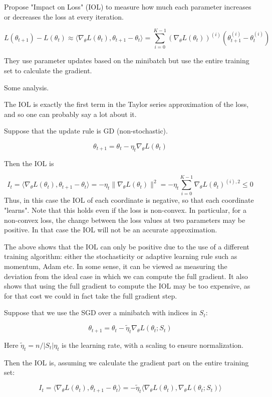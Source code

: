 \documentclass[english]{article}
\begin{document}
Propose "Impact on
Loss" (IOL) to measure how much each
parameter increases or decreases the loss at
every iteration.

$$L(\theta_{t+1} ) - L(\theta_{t} ) \approx 
\langle\nabla_\theta L(\theta_{t} ), \theta_{t+1} - \theta_{t} 
\rangle
=
\sum_{i=0}^{K-1}
(\nabla_\theta L(\theta_{t} ))^{(i)} (\theta
^{(i)}_{t+1}
- \theta^{(i)}_t)
$$

They use parameter updates based on the minibatch but use the entire training set to
calculate the gradient.


Some analysis.

The IOL is exactly the first term in the Taylor series approximation of the loss, and so one can probably say a lot about it. 

Suppose that the update rule is GD (non-stochastic). 

$$\theta_{t+1} = \theta_{t} - \eta_t \nabla_\theta L(\theta_{t})$$

Then the IOL is 

$$I_t = 
\langle\nabla_\theta L(\theta_{t} ), \theta_{t+1} - \theta_{t} 
\rangle
=
- \eta_t 
\|\nabla_\theta L(\theta_{t} )\|^2
=
- \eta_t\sum_{i=0}^{K-1}
\nabla_\theta L(\theta_{t} )^{(i),2}\le 0
$$
Thus, in this case the IOL of each coordinate is negative, so that each coordinate "learns". Note that this holds even if the loss is non-convex. In particular, for a non-convex loss, the change between the loss values at two parameters may be positive. In that case the IOL will not be an accurate approximation.

The above shows that the IOL can only be positive due to the use of a different training algorithm: either the stochasticity or adaptive learning rule such as momentum, Adam etc. In some sense, it can be viewed as measuring the deviation from the ideal case in which we can compute the full gradient. It also shows that using the full gradient to compute the IOL may be too expensive, as for that cost we could in fact take the full gradient step. 


Suppose that we use the SGD over a minibatch with indices in $S_t$: 

$$\theta_{t+1} = \theta_{t} - \tilde\eta_t \nabla_\theta L(\theta_{t};S_t)$$

Here $\tilde\eta_t = n/|S_t|\eta_t$ is the learning rate, with a scaling to ensure normalization. 

Then the IOL is, assuming we calculate the gradient part on the entire training set: 

$$I_t = 
\langle\nabla_\theta L(\theta_{t} ), \theta_{t+1} - \theta_{t} 
\rangle
=
- \tilde\eta_t 
\langle\nabla_\theta L(\theta_{t} ), \nabla_\theta L(\theta_{t};S_t)
\rangle 
$$
\end{document}
